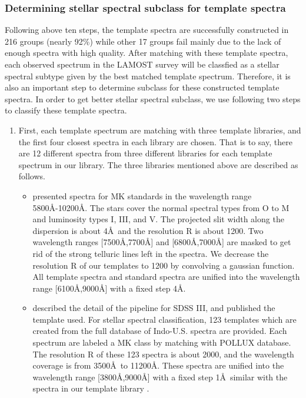 \documentclass[manuscript]{aastex}
\begin{document}
\subsubsection{Determining stellar spectral subclass for template spectra}
Following  above ten steps, the template spectra are successfully constructed in 216 groups  (nearly 92\%) while
other 17 groups fail mainly due to the lack of enough spectra with high quality.
After matching with these template spectra, each observed spectrum in the LAMOST survey will be classfied as a stellar spectral subtype given by the best matched template spectrum.
Therefore, it is also an important step to determine  subclass for these constructed template spectra.
In order to get better stellar spectral subclass, we use following two steps to classify these template spectra.
\begin{enumerate}
\item First, each template spectrum are matching with three template libraries, and the first four closest spectra in each library are chosen.
That is to say, there are 12 different spectra from three different libraries for each template spectrum in our library.
The three libraries mentioned above are described as follows.
    \begin{itemize}
         \item \citet{danks1994atlas} presented spectra  for MK standards in the wavelength range    5800\AA-10200\AA.
        The stars cover the normal spectral types from O to M and    luminosity types I, III, and V.
        The projected slit width along the dispersion is about 4\AA\, and the resolution R is about 1200.
        Two wavelength ranges [7500\AA,7700\AA] and [6800\AA,7000\AA] are masked to get rid of the strong telluric lines left in the spectra.
        We decrease the resolution R of our templates to 1200 by convolving a gaussian function.
        All template spectra and standard spectra are unified into the wavelength range [6100\AA,9000\AA] with a fixed step 4\AA.

         \item \citet{bolton2012spectral} described the detail of the pipeline for SDSS III, and published the template used. %
        For stellar spectral classification,  123 templates which are created from the full database of Indo-U.S. spectra are provided.
        Each spectrum are labeled a MK class by matching with POLLUX database.
        The resolution R of these 123 spectra is about 2000, and the wavelength coverage is from 3500\AA\ to 11200\AA.
        These spectra are unified into the wavelength range [3800\AA,9000\AA] with a fixed step 1\AA\ similar with the spectra in our template library .


\end{itemize}
\end{enumerate}
\end{document}
